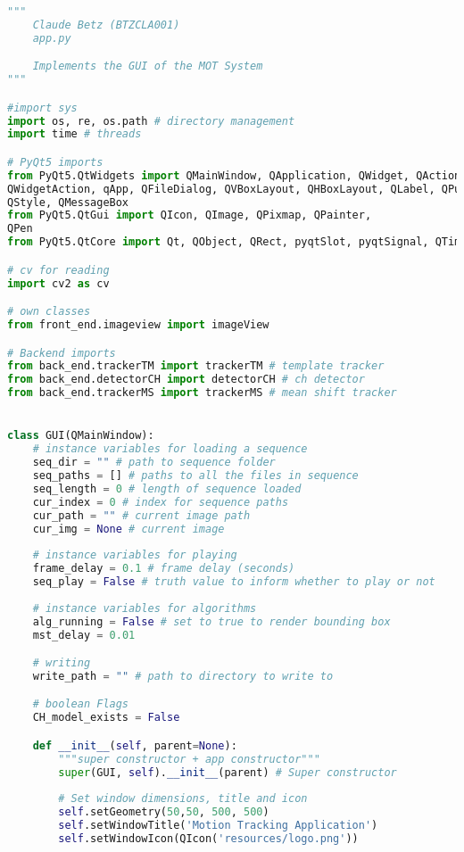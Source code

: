 \begin{lstlisting}[language=Python, caption={GUI Impementation Code}, captionpos=b, label={lst:gui}]
"""
    Claude Betz (BTZCLA001)
    app.py

    Implements the GUI of the MOT System
"""

#import sys
import os, re, os.path # directory management
import time # threads

# PyQt5 imports
from PyQt5.QtWidgets import QMainWindow, QApplication, QWidget, QAction,
QWidgetAction, qApp, QFileDialog, QVBoxLayout, QHBoxLayout, QLabel, QPushButton,
QStyle, QMessageBox 
from PyQt5.QtGui import QIcon, QImage, QPixmap, QPainter,
QPen
from PyQt5.QtCore import Qt, QObject, QRect, pyqtSlot, pyqtSignal, QTimer 

# cv for reading
import cv2 as cv

# own classes
from front_end.imageview import imageView

# Backend imports 
from back_end.trackerTM import trackerTM # template tracker 
from back_end.detectorCH import detectorCH # ch detector
from back_end.trackerMS import trackerMS # mean shift tracker


class GUI(QMainWindow):
    # instance variables for loading a sequence
    seq_dir = "" # path to sequence folder
    seq_paths = [] # paths to all the files in sequence
    seq_length = 0 # length of sequence loaded
    cur_index = 0 # index for sequence paths
    cur_path = "" # current image path 
    cur_img = None # current image 
    
    # instance variables for playing 
    frame_delay = 0.1 # frame delay (seconds)
    seq_play = False # truth value to inform whether to play or not
    
    # instance variables for algorithms
    alg_running = False # set to true to render bounding box
    mst_delay = 0.01

    # writing 
    write_path = "" # path to directory to write to 

    # boolean Flags
    CH_model_exists = False

    def __init__(self, parent=None):
        """super constructor + app constructor"""
        super(GUI, self).__init__(parent) # Super constructor
      
        # Set window dimensions, title and icon
        self.setGeometry(50,50, 500, 500)
        self.setWindowTitle('Motion Tracking Application')
        self.setWindowIcon(QIcon('resources/logo.png'))
                

\end{lstlisting}

